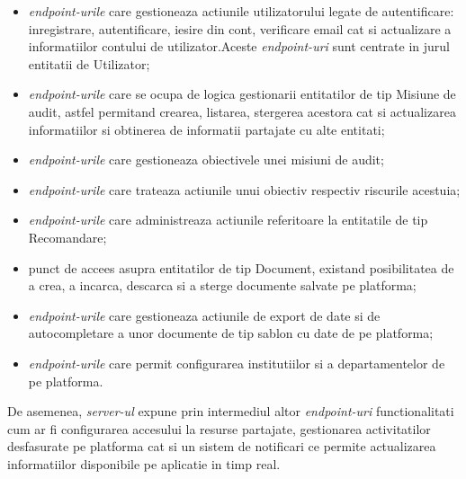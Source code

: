\begin{itemize}
	
	\item \textit{endpoint-urile} care gestioneaza actiunile utilizatorului legate de autentificare: inregistrare, autentificare, iesire din cont, verificare email cat si actualizare a informatiilor contului de utilizator.Aceste \textit{endpoint-uri} sunt centrate in jurul entitatii de Utilizator;
	
	\item \textit{endpoint-urile} care se ocupa de logica gestionarii entitatilor de tip Misiune de audit, astfel permitand crearea, listarea, stergerea acestora cat si actualizarea informatiilor si obtinerea de informatii partajate cu alte entitati;
	
	\item \textit{endpoint-urile} care gestioneaza obiectivele unei misiuni de audit;
	
	\item \textit{endpoint-urile} care trateaza actiunile unui obiectiv respectiv riscurile acestuia;
	
	\item \textit{endpoint-urile} care administreaza actiunile referitoare la entitatile de tip Recomandare;
	
	\item punct de accees asupra entitatilor de tip Document, existand posibilitatea de a crea, a incarca, descarca si a sterge documente salvate pe platforma;
	
	\item \textit{endpoint-urile} care gestioneaza actiunile de export de date si de autocompletare a unor documente de tip sablon cu date de pe platforma;
	
	\item \textit{endpoint-urile} care permit configurarea institutiilor si a departamentelor de pe platforma.
	
\end{itemize} 

De asemenea, \textit{server-ul} expune prin intermediul altor \textit{ endpoint-uri} functionalitati cum ar fi configurarea accesului la resurse partajate, gestionarea activitatilor desfasurate pe platforma cat si un sistem de notificari ce permite actualizarea informatiilor disponibile pe aplicatie in timp real.


	
 

